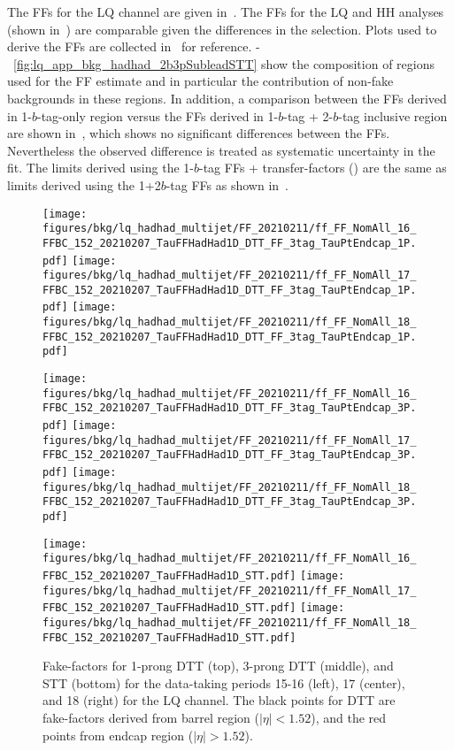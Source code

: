 The FFs for the LQ \hadhad channel are given in~. The FFs for the LQ and HH analyses (shown in~) are comparable given the differences in the selection. Plots used to derive the FFs are collected 
in~ for reference.  -~\ref{fig:lq_app_bkg_hadhad_2b3pSubleadSTT}  show the composition of regions used for the FF estimate and in particular the contribution 
of non-fake backgrounds in these regions. In addition, a comparison between the FFs derived in 1-$b$-tag-only region versus the FFs 
derived in 1-$b$-tag + 2-$b$-tag inclusive region are shown in~, which shows no significant
differences between the FFs. Nevertheless the observed difference is treated as systematic uncertainty in the fit.
The limits derived using the 1-$b$-tag FFs + transfer-factors () are the same as limits derived using the 1+2$b$-tag FFs as shown in~.


\begin{figure}
  \centering
  \texttt{[image: figures/bkg/lq\_hadhad\_multijet/FF\_20210211/ff\_FF\_NomAll\_16\_FFBC\_152\_20210207\_TauFFHadHad1D\_DTT\_FF\_3tag\_TauPtEndcap\_1P.pdf]}
  \texttt{[image: figures/bkg/lq\_hadhad\_multijet/FF\_20210211/ff\_FF\_NomAll\_17\_FFBC\_152\_20210207\_TauFFHadHad1D\_DTT\_FF\_3tag\_TauPtEndcap\_1P.pdf]}
  \texttt{[image: figures/bkg/lq\_hadhad\_multijet/FF\_20210211/ff\_FF\_NomAll\_18\_FFBC\_152\_20210207\_TauFFHadHad1D\_DTT\_FF\_3tag\_TauPtEndcap\_1P.pdf]}

  \texttt{[image: figures/bkg/lq\_hadhad\_multijet/FF\_20210211/ff\_FF\_NomAll\_16\_FFBC\_152\_20210207\_TauFFHadHad1D\_DTT\_FF\_3tag\_TauPtEndcap\_3P.pdf]}
  \texttt{[image: figures/bkg/lq\_hadhad\_multijet/FF\_20210211/ff\_FF\_NomAll\_17\_FFBC\_152\_20210207\_TauFFHadHad1D\_DTT\_FF\_3tag\_TauPtEndcap\_3P.pdf]}
  \texttt{[image: figures/bkg/lq\_hadhad\_multijet/FF\_20210211/ff\_FF\_NomAll\_18\_FFBC\_152\_20210207\_TauFFHadHad1D\_DTT\_FF\_3tag\_TauPtEndcap\_3P.pdf]}

  \texttt{[image: figures/bkg/lq\_hadhad\_multijet/FF\_20210211/ff\_FF\_NomAll\_16\_FFBC\_152\_20210207\_TauFFHadHad1D\_STT.pdf]}
  \texttt{[image: figures/bkg/lq\_hadhad\_multijet/FF\_20210211/ff\_FF\_NomAll\_17\_FFBC\_152\_20210207\_TauFFHadHad1D\_STT.pdf]}
  \texttt{[image: figures/bkg/lq\_hadhad\_multijet/FF\_20210211/ff\_FF\_NomAll\_18\_FFBC\_152\_20210207\_TauFFHadHad1D\_STT.pdf]}

  \caption{Fake-factors for 1-prong DTT (top), 3-prong DTT (middle), and STT (bottom) for the data-taking periods 15-16 (left),
           17 (center), and 18 (right) for the LQ \hadhad channel. The black points for DTT are fake-factors derived from barrel region ($|\eta| < 1.52$),
           and the red points from endcap region ($|\eta| > 1.52$).}

  \label{fig:lq_hadhad_fake_factors}
\end{figure}

